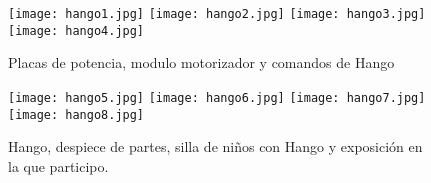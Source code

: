    \begin{figure}
      \begin{center}
         \texttt{[image: hango1.jpg]}
         \texttt{[image: hango2.jpg]}
         \texttt{[image: hango3.jpg]}
         \texttt{[image: hango4.jpg]}
      \end{center}
      \caption{Placas de potencia, modulo motorizador y comandos de Hango}
      \label{fig:hango1}
   \end{figure}
   \begin{figure}
      \begin{center}
         \texttt{[image: hango5.jpg]}
         \texttt{[image: hango6.jpg]}
         \texttt{[image: hango7.jpg]}
         \texttt{[image: hango8.jpg]}
      \end{center}
      \caption{Hango, despiece de partes, silla de niños con Hango y exposición en la que participo.}
      \label{fig:hango2}
   \end{figure}

